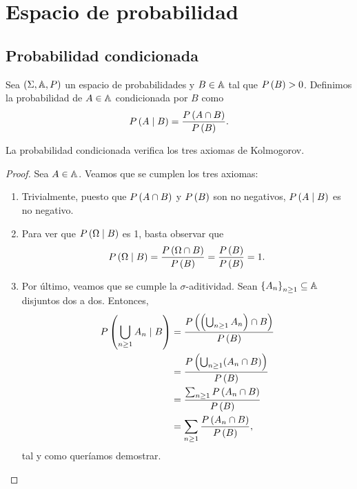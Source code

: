 \chapter{Espacio de probabilidad}

\section{Probabilidad condicionada}

\begin{definition}
  Sea $(\Sigma, \mathbb{A}, P)$ un espacio de probabilidades y $B \in \mathbb{A}$ tal
  que $P\left(B\right) > 0$. Definimos la probabilidad de $A \in \mathbb{A}$
  condicionada por $B$ como
  \[
    P\left(A \mid B\right) = \frac{P\left(A \cap B\right)}{P\left(B\right)}.
  \]
\end{definition}

\begin{proposition}
  La probabilidad condicionada verifica los tres axiomas de Kolmogorov.
\end{proposition}

\begin{proof}
  Sea $A \in \mathbb{A}$. Veamos que se cumplen los tres axiomas:
  \begin{enumerate}
    \item Trivialmente, puesto que $P\left(A \cap B\right)$ y $P\left(B\right)$ son no
    negativos, $P\left(A \mid B\right)$ es no negativo.
    \item Para ver que $P\left(\Omega \mid B\right)$ es 1, basta observar que
    \[
      P\left(\Omega \mid B\right) = \frac{P\left(\Omega \cap B\right)}{P\left(B\right)}
      = \frac{P\left(B\right)}{P\left(B\right)} = 1.
    \]
    \item Por último, veamos que se cumple la $\sigma$-aditividad. Sean
    $\left\lbrace A_n\right\rbrace_{n \ge 1} \subseteq \mathbb{A}$ disjuntos dos a dos. Entonces,
    \[
      \begin{split}
        P\left(\bigcup_{n \ge 1} A_n \mid B\right) &=
        \frac{P\left(\left(\bigcup_{n \ge 1} 
        A_n\right) \cap B\right)}{P\left(B\right)} \\
        &= \frac{P\left(\bigcup_{n \ge 1} (A_n \cap B)\right)}{P\left(B\right)} \\
        &= \frac{\sum_{n \ge 1} P\left(A_n \cap B\right)}{P\left(B\right)} \\
        &= \sum_{n \ge 1} \frac{P\left(A_n \cap B\right)}{P\left(B\right)}, \\
      \end{split}
    \]
    tal y como queríamos demostrar.
  \end{enumerate}
\end{proof}


